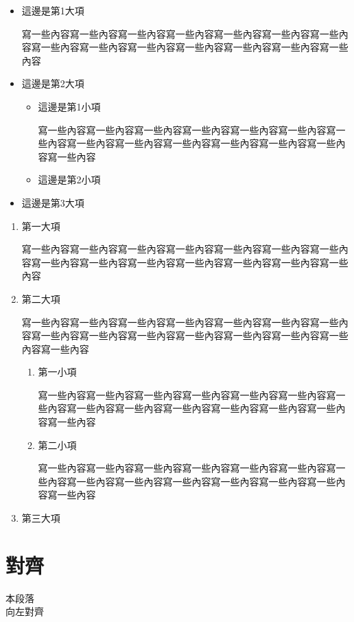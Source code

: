 \begin{itemize}
    \item 這邊是第1大項
          \par 寫一些內容寫一些內容寫一些內容寫一些內容寫一些內容寫一些內容寫一些內容寫一些內容寫一些內容寫一些內容寫一些內容寫一些內容寫一些內容寫一些內容
    \item 這邊是第2大項
          \begin{itemize}
              \item 這邊是第1小項
                    \par 寫一些內容寫一些內容寫一些內容寫一些內容寫一些內容寫一些內容寫一些內容寫一些內容寫一些內容寫一些內容寫一些內容寫一些內容寫一些內容寫一些內容
              \item 這邊是第2小項
          \end{itemize}
    \item 這邊是第3大項
\end{itemize}

\begin{enumerate}
    \item 第一大項
          \par 寫一些內容寫一些內容寫一些內容寫一些內容寫一些內容寫一些內容寫一些內容寫一些內容寫一些內容寫一些內容寫一些內容寫一些內容寫一些內容寫一些內容
    \item 第二大項
          \par 寫一些內容寫一些內容寫一些內容寫一些內容寫一些內容寫一些內容寫一些內容寫一些內容寫一些內容寫一些內容寫一些內容寫一些內容寫一些內容寫一些內容寫一些內容
          \begin{enumerate}
              \item 第一小項
                    \par 寫一些內容寫一些內容寫一些內容寫一些內容寫一些內容寫一些內容寫一些內容寫一些內容寫一些內容寫一些內容寫一些內容寫一些內容寫一些內容寫一些內容
              \item 第二小項
                    \par 寫一些內容寫一些內容寫一些內容寫一些內容寫一些內容寫一些內容寫一些內容寫一些內容寫一些內容寫一些內容寫一些內容寫一些內容寫一些內容寫一些內容
          \end{enumerate}
    \item 第三大項
\end{enumerate}

\newpage

\section{對齊}
\begin{flushleft}
    本段落\\
    向左對齊
\end{flushleft}

